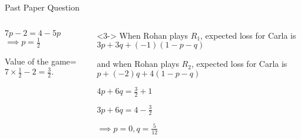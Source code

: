 \documentclass[8pt]{beamer}
\begin{document}
\begin{frame}[shrink=15]{Past Paper Question}
\begin{columns}[T]
\begin{column}{.4\linewidth}
\begin{solution}
				  $7p-2=4-5p$
		$\implies p=\frac{1}{2}$

		Value of the game=$7\times \frac{1}{2}-2=\frac{3}{2}.$
	\end{solution}
	\end{column}
	\begin{column}{.3\textwidth}
		\begin{solution}<3->
		When Rohan plays $R_1$, expected loss for Carla is $3p+3q+(-1)(1-p-q)$

		and when Rohan plays  $ R_2$, expected loss for Carla is $p+(-2)q+4(1-p-q)$

		 $4p+6q=\frac{3}{2}+1$ 

		 $3p+6q=4-\frac{3}{2}$ 

		 $\implies p=0,q=\frac{5}{12}$
	 \end{solution}
	\end{column}
	\end{columns}

\end{frame}
\end{document}
